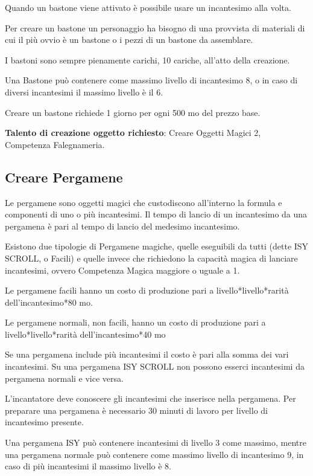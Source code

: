 \begin{multicols}{2}
Quando un bastone viene attivato è possibile usare un incantesimo alla volta.

Per creare un bastone un personaggio ha bisogno di una provvista di materiali di cui il più ovvio è un bastone o i pezzi di un bastone da assemblare.

I bastoni sono sempre pienamente carichi, 10 cariche, all'atto della creazione.

Una Bastone può contenere come massimo livello di incantesimo 8, o in caso di diversi incantesimi il massimo livello è il 6.

Creare un bastone richiede 1 giorno per ogni 500 mo del prezzo base.

\medskip

\textbf{Talento di creazione oggetto richiesto}: Creare Oggetti Magici 2, Competenza Falegnameria.

\subsection{Creare Pergamene}
\label{crearepergamene}\hypertarget{crearepergamene}{}

Le pergamene sono oggetti magici che custodiscono all'interno la formula e componenti di uno o più incantesimi. Il tempo di lancio di un incantesimo da una pergamena è pari al tempo di lancio del medesimo incantesimo.

Esistono due tipologie di Pergamene magiche, quelle eseguibili da tutti (dette ISY SCROLL, o Facili) e quelle invece che richiedono la capacità magica di lanciare incantesimi, ovvero Competenza Magica maggiore o uguale a 1.

Le pergamene facili hanno un costo di produzione pari a livello*livello*rarità dell'incantesimo*80 mo.

Le pergamene normali, non facili, hanno un costo di produzione pari a livello*livello*rarità dell'incantesimo*40 mo

Se una pergamena include più incantesimi il costo è pari alla somma dei vari incantesimi. Su una pergamena ISY SCROLL non possono esserci incantesimi da pergamena normali e vice versa.

L'incantatore deve conoscere gli incantesimi che inserisce nella pergamena. Per preparare una pergamena è necessario 30 minuti di lavoro per livello di incantesimo presente.

Una pergamena ISY può contenere incantesimi di livello 3 come massimo, mentre una pergamena normale può contenere come massimo livello di incantesimo 9, in caso di più incantesimi il massimo livello è 8.


\end{multicols}
